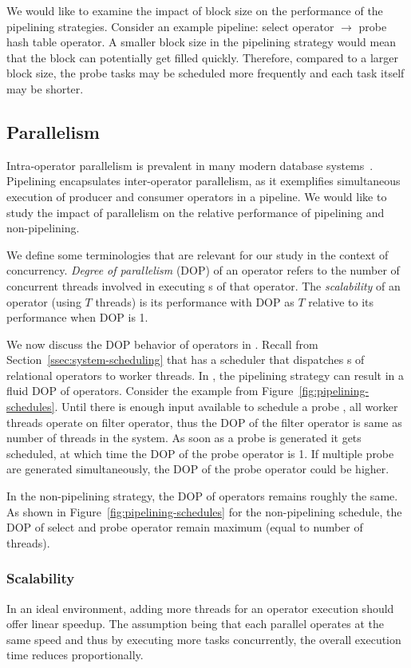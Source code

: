 We would like to examine the impact of block size on the performance of the pipelining strategies. 
Consider an example pipeline: select operator $\rightarrow$ probe hash table operator.
A smaller block size in the pipelining strategy would mean that the block can potentially get filled quickly. 
Therefore, compared to a larger block size, the probe tasks may be scheduled more frequently and each task itself may be shorter. 

\subsection{Parallelism}
Intra-operator parallelism is prevalent in many modern database systems~\cite{monetdb, morsel, quickstep-system, vectorwise}.
Pipelining encapsulates inter-operator parallelism, as it exemplifies simultaneous execution of producer and consumer operators in a pipeline.
We would like to study the impact of parallelism on the relative performance of pipelining and non-pipelining.

We define some terminologies that are relevant for our study in the context of concurrency.
\textit{Degree of parallelism} (DOP) of an operator refers to the number of concurrent threads involved in executing \wo{}s of that operator. 
The \textit{scalability} of an operator (using $T$ threads) is its performance with DOP as $T$ relative to its performance when DOP is 1.

We now discuss the DOP behavior of operators in \sys{}.
Recall from Section~\ref{ssec:system-scheduling} that \sys{} has a scheduler that dispatches \wo{}s  of relational operators to worker threads.
In \sys{}, the pipelining strategy can result in a fluid DOP of operators.
Consider the example from Figure~\ref{fig:pipelining-schedules}.
Until there is enough input available to schedule a probe \wo{}, all worker threads operate on filter operator, thus the DOP of the filter operator is same as number of threads in the system.
As soon as a probe \wo{} is generated it gets scheduled, at which time the DOP of the probe operator is 1.
If multiple probe \wo{} are generated simultaneously, the DOP of the probe operator could be higher.

In the non-pipelining strategy, the DOP of operators remains roughly the same.
As shown in Figure~\ref{fig:pipelining-schedules} for the non-pipelining schedule, the DOP of select and probe operator remain maximum (equal to number of threads).  

\subsubsection{Scalability}\label{sssec:scalability}
In an ideal environment, adding more threads for an operator execution should offer linear speedup.
The assumption being that each parallel \wo{} operates at the same speed and thus by executing more tasks concurrently, the overall execution time reduces proportionally. 

